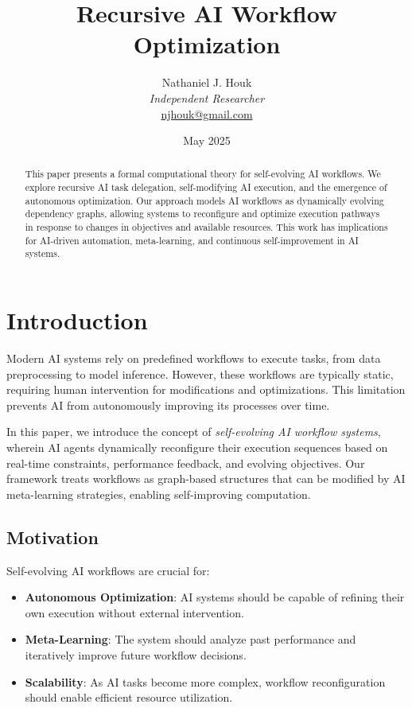 \documentclass{article}
\title{Recursive AI Workflow Optimization}
\author{Nathaniel J. Houk\\
\textit{Independent Researcher}\\
\href{mailto:njhouk@gmail.com}{njhouk@gmail.com}}
\date{May 2025}
\begin{document}
\maketitle
\tableofcontents

\begin{abstract}
This paper presents a formal computational theory for self-evolving AI workflows. We explore recursive AI task delegation, self-modifying AI execution, and the emergence of autonomous optimization. Our approach models AI workflows as dynamically evolving dependency graphs, allowing systems to reconfigure and optimize execution pathways in response to changes in objectives and available resources. This work has implications for AI-driven automation, meta-learning, and continuous self-improvement in AI systems.
\end{abstract}

\section{Introduction}

Modern AI systems rely on predefined workflows to execute tasks, from data preprocessing to model inference. However, these workflows are typically static, requiring human intervention for modifications and optimizations. This limitation prevents AI from autonomously improving its processes over time.

In this paper, we introduce the concept of \emph{self-evolving AI workflow systems}, wherein AI agents dynamically reconfigure their execution sequences based on real-time constraints, performance feedback, and evolving objectives. Our framework treats workflows as graph-based structures that can be modified by AI meta-learning strategies, enabling self-improving computation.

\subsection{Motivation}

Self-evolving AI workflows are crucial for:
\begin{itemize}
    \item \textbf{Autonomous Optimization}: AI systems should be capable of refining their own execution without external intervention.
    \item \textbf{Meta-Learning}: The system should analyze past performance and iteratively improve future workflow decisions.
    \item \textbf{Scalability}: As AI tasks become more complex, workflow reconfiguration should enable efficient resource utilization.
\end{itemize}
\end{document}
